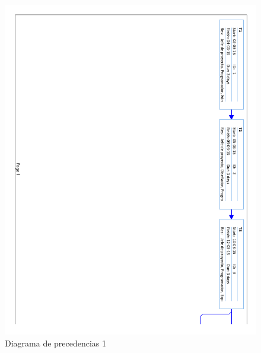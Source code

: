 \begin{figure}[!htbp]
	\centering
	\includegraphics[page=1, scale=.65]{fig/network_diagram}
	\caption{Diagrama de precedencias 1}
\end{figure}

